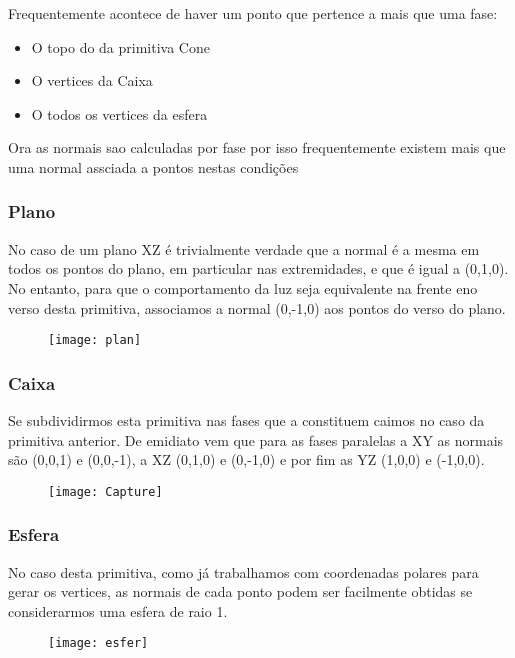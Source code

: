 \documentclass{article}
\begin{document}
\begin{info}
	Frequentemente acontece de haver um ponto que pertence a mais que uma fase:\\
    \begin{itemize}
        \item O topo do da primitiva Cone
        \item O vertices da Caixa
        \item O todos os vertices da esfera
	\end{itemize}
	Ora as normais sao calculadas por fase por isso frequentemente existem mais que uma normal assciada a pontos nestas condições
\end{info}

\subsubsection{ Plano } 
No caso de um plano XZ é trivialmente verdade que a normal é a mesma em todos os pontos do plano, em particular nas extremidades, e que é igual a (0,1,0). No entanto, para que o comportamento da luz seja equivalente na frente eno verso desta primitiva, associamos a normal (0,-1,0) aos pontos do verso do plano.
\begin{figure}[H]
	\centering
	\texttt{[image: plan]}
\end{figure}

\subsubsection{ Caixa }
Se subdividirmos esta primitiva nas fases que a constituem caimos no caso da primitiva anterior. De emidiato vem que para as fases paralelas a XY as normais são (0,0,1) e (0,0,-1), a XZ (0,1,0) e (0,-1,0) e por fim as YZ (1,0,0) e (-1,0,0).\\  
\begin{figure}[H]
	\centering
	\texttt{[image: Capture]}
\end{figure}

\subsubsection{ Esfera }
No caso desta primitiva, como já trabalhamos com coordenadas polares para gerar os vertices, as normais de cada ponto podem ser facilmente obtidas se considerarmos uma esfera de raio 1.  
\begin{figure}[H]
	\centering
	\texttt{[image: esfer]}
\end{figure}
\end{document}
